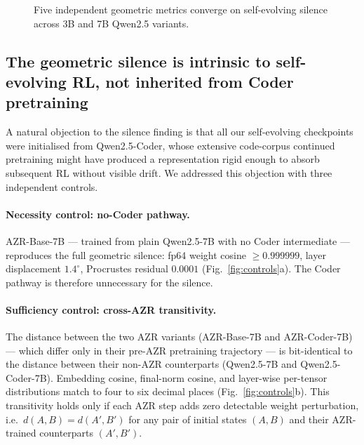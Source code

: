\documentclass[11pt,a4paper]{article}
\begin{document}
\begin{figure}[t]
  \centering
  \caption{Five independent geometric metrics converge on self-evolving
    silence across 3B and 7B Qwen2.5 variants.}
  \label{fig:silence}
\end{figure}

\subsection{The geometric silence is intrinsic to self-evolving RL,
not inherited from Coder pretraining}
\label{sec:controls}

A natural objection to the silence finding is that all our self-evolving
checkpoints were initialised from Qwen2.5-Coder, whose extensive
code-corpus continued pretraining might have produced a representation
rigid enough to absorb subsequent RL without visible drift. We addressed
this objection with three independent controls.

\paragraph{Necessity control: no-Coder pathway.}
AZR-Base-7B — trained from plain Qwen2.5-7B with no Coder intermediate —
reproduces the full geometric silence: fp64 weight cosine
$\geq 0.999999$, layer displacement $1.4^{\circ}$, Procrustes residual
$0.0001$ (Fig.~\ref{fig:controls}a). The Coder pathway is therefore
unnecessary for the silence.

\paragraph{Sufficiency control: cross-AZR transitivity.}
The distance between the two AZR variants (AZR-Base-7B and AZR-Coder-7B) —
which differ only in their pre-AZR pretraining trajectory — is
bit-identical to the distance between their non-AZR counterparts
(Qwen2.5-7B and Qwen2.5-Coder-7B). Embedding cosine, final-norm cosine,
and layer-wise per-tensor distributions match to four to six decimal
places (Fig.~\ref{fig:controls}b). This transitivity holds only if each
AZR step adds zero detectable weight perturbation, i.e.\
$d(A, B) = d(A', B')$ for any pair of initial states $(A, B)$ and their
AZR-trained counterparts $(A', B')$.
\end{document}

